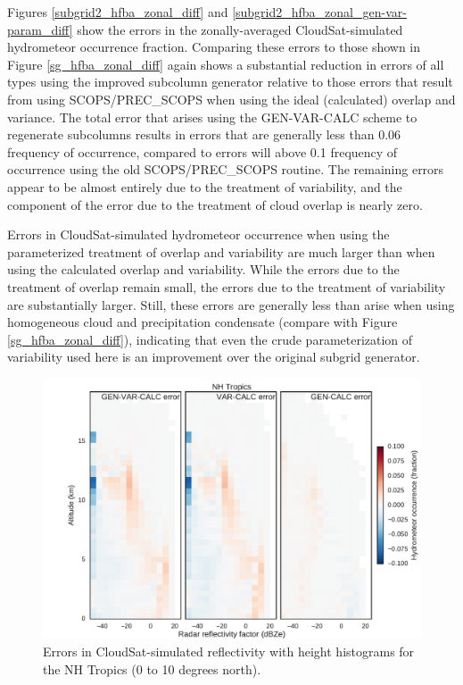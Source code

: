 Figures \ref{subgrid2_hfba_zonal_diff} and \ref{subgrid2_hfba_zonal_gen-var-param_diff} show the errors in the zonally-averaged CloudSat-simulated hydrometeor occurrence fraction. Comparing these errors to those shown in Figure \ref{sg_hfba_zonal_diff} again shows a substantial reduction in errors of all types using the improved subcolumn generator relative to those errors that result from using SCOPS/PREC\_SCOPS when using the ideal (calculated) overlap and variance. The total error that arises using the GEN-VAR-CALC scheme to regenerate subcolumns results in errors that are generally less than 0.06 frequency of occurrence, compared to errors will above 0.1 frequency of occurrence using the old SCOPS/PREC\_SCOPS routine. The remaining errors appear to be almost entirely due to the treatment of variability, and the component of the error due to the treatment of cloud overlap is nearly zero.

Errors in CloudSat-simulated hydrometeor occurrence when using the parameterized treatment of overlap and variability are much larger than when using the calculated overlap and variability. While the errors due to the treatment of overlap remain small, the errors due to the treatment of variability are substantially larger. Still, these errors are generally less than arise when using homogeneous cloud and precipitation condensate (compare with Figure \ref{sg_hfba_zonal_diff}), indicating that even the crude parameterization of variability used here is an improvement over the original subgrid generator.

\begin{figure}
\centering
\includegraphics[width=\columnwidth]{graphics/subgrid2_cfadDbze94_NHTropics_gen-var-calc_diff.pdf}
\caption{Errors in CloudSat-simulated reflectivity with height histograms for the NH Tropics (0 to 10 degrees north).}
\label{subgrid2_cfadDbze94_nhtropics_diff}
\end{figure}

